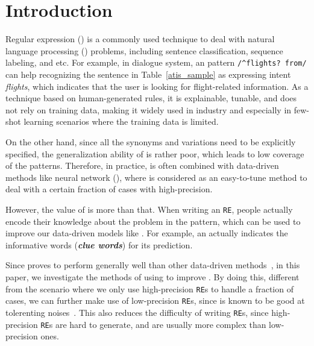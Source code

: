 \section{Introduction}



Regular expression (\RE) is a commonly used technique to deal with natural language processing (\NLP) problems, including sentence classification, sequence labeling, and etc.
For example, in dialogue system, an \RE pattern \texttt{/\textasciicircum flights? from/} can help recognizing the sentence in Table~\ref{atis_sample} as expressing intent \emph{flights}, which indicates that the user is looking for flight-related information.
As a technique based on human-generated rules, it is explainable, tunable, and does not rely on training data, making it widely used in industry and especially in few-shot learning scenarios where the training data is limited.

On the other hand, since all the synonyms and variations need to be explicitly specified, the generalization ability of \RE is rather poor, which leads to low coverage of the patterns. Therefore, in practice, \RE is often combined with data-driven methods like neural network (\NN), where \RE is considered as an easy-to-tune method to deal with a certain fraction of cases with high-precision. 

However, the value of \RE is more than that. When writing an \texttt{RE}, people actually encode their knowledge about the problem in the pattern, which can be used to improve our data-driven models like \NN. For example, an \RE actually indicates the informative words (\textbf{\emph{clue words}}) for its prediction.

Since \NN proves to perform generally well than other data-driven methods~\cite{kim2014convolutional, bahdanau2014neural}, in this paper, we investigate the methods of using \RE to improve \NN. 
By doing this, different from the scenario where we only use high-precision \texttt{RE}s to handle a fraction of cases, we can further make use of low-precision \texttt{RE}s, since \NN is known to be good at tolerenting noises~\cite{xie2016disturblabel}. 
This also reduces the difficulty of writing \texttt{RE}s, since high-precision \texttt{RE}s are hard to generate, and are usually more complex than low-precision ones.

